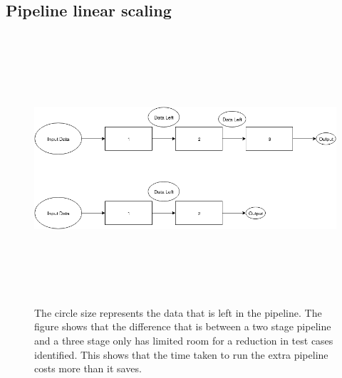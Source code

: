 \begin{appendices}
\chapter{Pipeline linear scaling}
\begin{figure}[h]
\centering
\includegraphics[width=\textwidth,height=10cm]{PipelineComp.png}
\caption{The circle size represents the data that is left in the pipeline. The figure shows that the difference that is between a two stage pipeline and a three stage only has limited room for a reduction in test cases identified. This shows that the time taken to run the extra pipeline costs more than it saves.}
\label{fig:pipelinecomp}
\end{figure}


\end{appendices}
